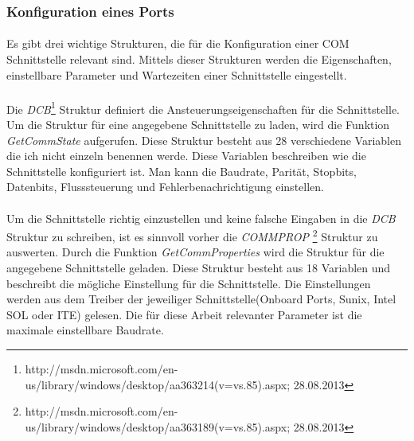 \subsubsection{Konfiguration eines Ports}
\paragraph{}
Es gibt drei wichtige Strukturen, die für die Konfiguration einer COM Schnittstelle relevant sind. Mittels dieser Strukturen werden die Eigenschaften, einstellbare Parameter und Wartezeiten einer Schnittstelle eingestellt.

\paragraph{}
Die \textit{DCB}\footnote{http://msdn.microsoft.com/en-us/library/windows/desktop/aa363214(v=vs.85).aspx; 28.08.2013} Struktur definiert die Ansteuerungseigenschaften für die Schnittstelle. Um die Struktur für eine angegebene Schnittstelle zu laden, wird die Funktion \textit{GetCommState} aufgerufen. Diese Struktur besteht aus 28 verschiedene Variablen die ich nicht einzeln benennen werde. Diese Variablen beschreiben wie die Schnittstelle konfiguriert ist. Man kann die Baudrate, Parität, Stopbits, Datenbits, Flusssteuerung und Fehlerbenachrichtigung einstellen.

\paragraph{}
Um die Schnittstelle richtig einzustellen und keine falsche Eingaben in die \textit{DCB} Struktur zu schreiben, ist es sinnvoll vorher die \textit{COMMPROP} \footnote{http://msdn.microsoft.com/en-us/library/windows/desktop/aa363189(v=vs.85).aspx; 28.08.2013} Struktur zu auswerten. Durch die Funktion \textit{GetCommProperties} wird die Struktur für die angegebene Schnittstelle geladen. Diese Struktur besteht aus 18 Variablen und beschreibt die mögliche Einstellung für die Schnittstelle. Die Einstellungen werden aus dem Treiber der jeweiliger Schnittstelle(Onboard Ports, Sunix, Intel SOL oder ITE) gelesen. Die für diese Arbeit relevanter Parameter ist die maximale einstellbare Baudrate.


